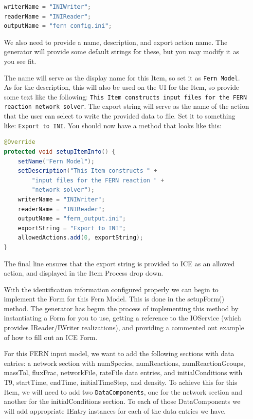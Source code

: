 \begin{lstlisting}[language=Java]
writerName = "INIWriter";
readerName = "INIReader";
outputName = "fern_config.ini";
\end{lstlisting}

We also need to provide a name, description, and export action name. The
generator will provide some default strings for these, but you may modify it
as you see fit. 

The name will serve as the display name for this Item, so set it
as \texttt{Fern Model}.
As for the description, this will also be used on the UI for the Item, so
provide some text like the following: \texttt{This Item constructs input files
for the FERN reaction network solver}. The export string will serve as the name
of the action that the user can select to write the provided data to file. Set
it to something like: \texttt{Export to INI}. You should now have a method that
looks like this:

\begin{lstlisting}[language=Java]
@Override
protected void setupItemInfo() {
	setName("Fern Model");
	setDescription("This Item constructs " +
	    "input files for the FERN reaction " +
	    "network solver"); 
	writerName = "INIWriter";
	readerName = "INIReader";     	
	outputName = "fern_output.ini";   
	exportString = "Export to INI";
	allowedActions.add(0, exportString);
}
\end{lstlisting}

The final line ensures that the export string is provided to ICE as an allowed
action, and displayed in the Item Process drop down.

With the identification information configured properly we can begin to
implement the Form for this Fern Model. This is done in the setupForm() method.
The generator has begun the process of implementing this method by instantiating
a Form for you to use, getting a reference to the IOService (which provides
IReader/IWriter realizations), and providing a commented out example of how to
fill out an ICE Form.

For this FERN input model, we want to add the following sections with data
entries: a network section with 
numSpecies, numReactions, numReactionGroups, massTol, fluxFrac, networkFile,
rateFile data entries, and initialConditions with T9, startTime, endTime,
initialTimeStep, and density. To achieve this for this Item, we will need to add
two \texttt{DataComponents}, one for the network section and another for the
initialConditions section. To each of those DataComponents we will add
appropriate IEntry instances for each of the data entries we have. 

